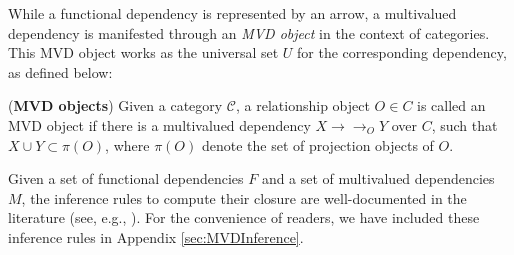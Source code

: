 


 While a functional dependency is represented by an arrow, a multivalued dependency is manifested through an \textit{MVD object} in the context of categories. This MVD object works as the universal set $U$ for the corresponding dependency, as defined below:

\begin{definition} (\textbf{MVD objects}) Given a category $\mathcal{C}$, a relationship object $O \in C$ is called an MVD object if there is a multivalued dependency $X \to\to_O Y$ over $C$, such that  $X \cup Y \subset \pi(O) $,  where $\pi(O)$ denote the set of projection objects of $O$. \label{def:MVD}
\end{definition}


Given a set of functional dependencies \( F \) and a set of multivalued dependencies \( M \), the inference rules to compute their closure are well-documented in the literature (see, e.g., \cite{10.5555/551350,10.1145/320613.320614,10.1145/509404.509414}). For the convenience of readers, we have included these inference rules in Appendix \ref{sec:MVDInference}.

